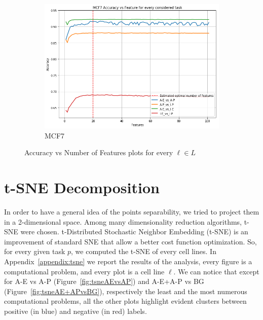 \begin{figure}[!htb]
    \begin{subfigure}[b]{0.48\textwidth}
        \includegraphics[width=\textwidth]{images/features_plots_accuracy/MCF7_n_features.png}
        \caption{MCF7}
        \label{fig:MCF7_n_feat}
    \end{subfigure}
    \caption{Accuracy vs Number of Features plots for every $\ell \in L$}\label{fig:feats_plot_accuracy}
\end{figure}

\section{t-SNE Decomposition}
In order to have a general idea of the points separability, we tried to  project them in a 2-dimensional space. Among many dimensionality reduction algorithms, t-SNE were chosen. t-Distributed Stochastic Neighbor Embedding (t-SNE) \cite{vanDerMaaten2008} is an improvement of standard SNE \cite{HintonSNE} that allow a better cost function optimization. So, for every given task $p$, we  computed the t-SNE of every cell lines. 
In Appendix~\ref{appendix:tsne} we report the results of the analysis, every figure is a computational problem, and every plot is a cell line $\ell$. We can notice that except for A-E vs A-P (Figure~\ref{fig:tsneAEvsAP}) and A-E+A-P vs BG (Figure~\ref{fig:tsneAE+APvsBG}), respectively the least and the most numerous computational problems, all the other plots highlight evident clusters between positive (in blue) and negative (in red) labels. 